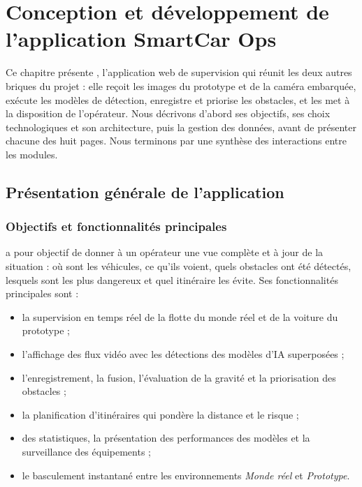 \chapter{Conception et développement de l'application SmartCar Ops}

\chapintro
Ce chapitre présente \app, l'application web de supervision qui réunit les deux autres briques du projet : elle
reçoit les images du prototype et de la caméra embarquée, exécute les modèles de détection, enregistre et priorise
les obstacles, et les met à la disposition de l'opérateur. Nous décrivons d'abord ses objectifs, ses choix
technologiques et son architecture, puis la gestion des données, avant de présenter chacune des huit pages. Nous
terminons par une synthèse des interactions entre les modules.

\section{Présentation générale de l'application}

\subsection{Objectifs et fonctionnalités principales}
\app{} a pour objectif de donner à un opérateur une vue complète et à jour de la situation : où sont les véhicules,
ce qu'ils voient, quels obstacles ont été détectés, lesquels sont les plus dangereux et quel itinéraire les évite.
Ses fonctionnalités principales sont :
\begin{itemize}
  \item la supervision en temps réel de la flotte du monde réel et de la voiture du prototype ;
  \item l'affichage des flux vidéo avec les détections des modèles d'IA superposées ;
  \item l'enregistrement, la fusion, l'évaluation de la gravité et la priorisation des obstacles ;
  \item la planification d'itinéraires qui pondère la distance et le risque ;
  \item des statistiques, la présentation des performances des modèles et la surveillance des équipements ;
  \item le basculement instantané entre les environnements \emph{Monde réel} et \emph{Prototype}.
\end{itemize}

